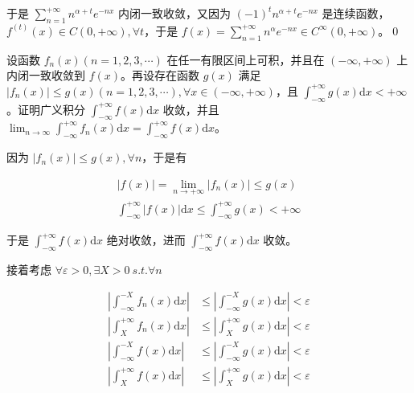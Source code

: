 于是 $\displaystyle \sum _{n=1}^{+\infty } n^{\alpha +t} e^{-nx}$ 内闭一致收敛，又因为 $\displaystyle ( -1)^{t} n^{\alpha +t} e^{-nx}$ 是连续函数，$\displaystyle f^{( t)}( x) \in C( 0,+\infty ) ,\forall t$，于是 $\displaystyle f( x) =\sum _{n=1}^{+\infty } n^{\alpha } e^{-nx} \in C^{\infty }( 0,+\infty )$。\qed 







\begin{ques}
	设函数 $\displaystyle f_{n}( x)( n=1,2,3,\cdots )$ 在任一有限区间上可积，并且在 $\displaystyle ( -\infty ,+\infty )$ 上内闭一致收敛到 $\displaystyle f( x)$。再设存在函数 $\displaystyle g( x)$ 满足 $\displaystyle |f_{n}( x) |\leqslant g( x)( n=1,2,3,\cdots ) ,\forall x\in ( -\infty ,+\infty )$，且 $\displaystyle \int _{-\infty }^{+\infty } g( x)\mathrm{d} x< +\infty $。证明广义积分 $\displaystyle \int _{-\infty }^{+\infty } f( x)\mathrm{d} x$ 收敛，并且 $\displaystyle \lim _{n\rightarrow \infty }\int _{-\infty }^{+\infty } f_{n}( x)\mathrm{d} x=\int _{-\infty }^{+\infty } f( x)\mathrm{d} x$。
\end{ques}





因为 $\displaystyle |f_{n}( x) |\leqslant g( x) ,\forall n$，于是有


\begin{gather*}
|f( x) |=\lim _{n\rightarrow +\infty } |f_{n}( x) |\leqslant g( x)\\
\int _{-\infty }^{+\infty } |f( x) |\mathrm{d} x\leqslant \int _{-\infty }^{+\infty } g( x) < +\infty 
\end{gather*}


于是 $\displaystyle \int _{-\infty }^{+\infty } f( x)\mathrm{d} x$ 绝对收敛，进而 $\displaystyle \int _{-\infty }^{+\infty } f( x)\mathrm{d} x$ 收敛。

接着考虑 $\displaystyle \forall \varepsilon  >0,\exists X >0\ s.t.\forall n$


\begin{align*}
\left| \int _{-\infty }^{-X} f_{n}( x)\mathrm{d} x\right|  & \leqslant \left| \int _{-\infty }^{-X} g( x)\mathrm{d} x\right| < \varepsilon \\
\left| \int _{X}^{+\infty } f_{n}( x)\mathrm{d} x\right|  & \leqslant \left| \int _{X}^{+\infty } g( x)\mathrm{d} x\right| < \varepsilon \\
\left| \int _{-\infty }^{-X} f( x)\mathrm{d} x\right|  & \leqslant \left| \int _{-\infty }^{-X} g( x)\mathrm{d} x\right| < \varepsilon \\
\left| \int _{X}^{+\infty } f( x)\mathrm{d} x\right|  & \leqslant \left| \int _{X}^{+\infty } g( x)\mathrm{d} x\right| < \varepsilon 
\end{align*}


